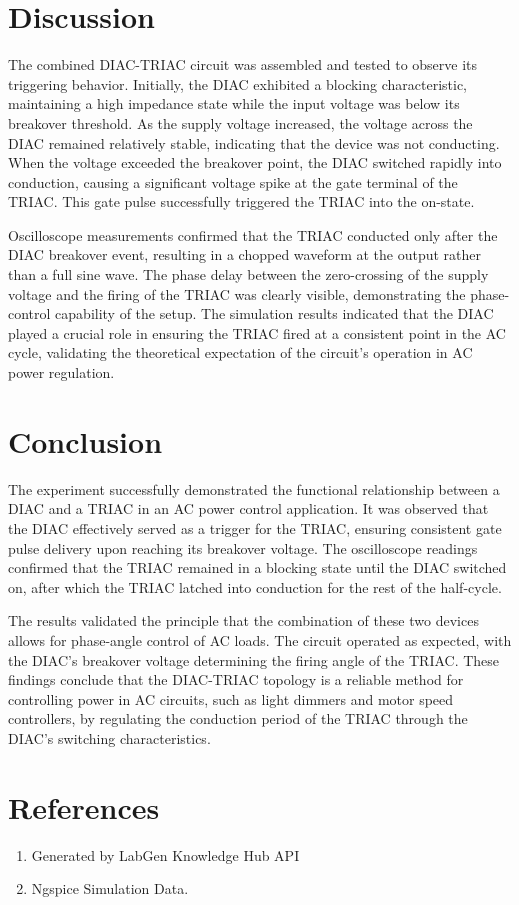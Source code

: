 \documentclass[12pt,a4paper]{article}
\begin{document}
\section{Discussion}
The combined DIAC-TRIAC circuit was assembled and tested to observe its triggering behavior. Initially, the DIAC exhibited a blocking characteristic, maintaining a high impedance state while the input voltage was below its breakover threshold. As the supply voltage increased, the voltage across the DIAC remained relatively stable, indicating that the device was not conducting. When the voltage exceeded the breakover point, the DIAC switched rapidly into conduction, causing a significant voltage spike at the gate terminal of the TRIAC. This gate pulse successfully triggered the TRIAC into the on-state. 

Oscilloscope measurements confirmed that the TRIAC conducted only after the DIAC breakover event, resulting in a chopped waveform at the output rather than a full sine wave. The phase delay between the zero-crossing of the supply voltage and the firing of the TRIAC was clearly visible, demonstrating the phase-control capability of the setup. The simulation results indicated that the DIAC played a crucial role in ensuring the TRIAC fired at a consistent point in the AC cycle, validating the theoretical expectation of the circuit's operation in AC power regulation.

\section{Conclusion}
The experiment successfully demonstrated the functional relationship between a DIAC and a TRIAC in an AC power control application. It was observed that the DIAC effectively served as a trigger for the TRIAC, ensuring consistent gate pulse delivery upon reaching its breakover voltage. The oscilloscope readings confirmed that the TRIAC remained in a blocking state until the DIAC switched on, after which the TRIAC latched into conduction for the rest of the half-cycle. 

The results validated the principle that the combination of these two devices allows for phase-angle control of AC loads. The circuit operated as expected, with the DIAC's breakover voltage determining the firing angle of the TRIAC. These findings conclude that the DIAC-TRIAC topology is a reliable method for controlling power in AC circuits, such as light dimmers and motor speed controllers, by regulating the conduction period of the TRIAC through the DIAC's switching characteristics.

\section{References}
\begin{enumerate}

    \item Generated by LabGen Knowledge Hub API

    \item Ngspice Simulation Data.

\end{enumerate}
\end{document}
